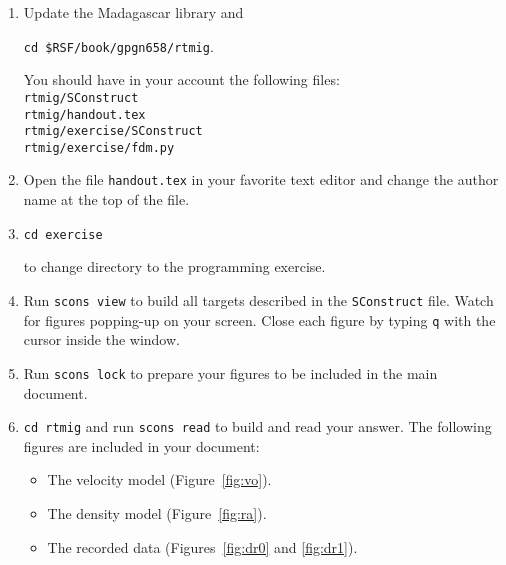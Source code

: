\begin{enumerate}

\item Update the Madagascar library and

\texttt{cd \$RSF/book/gpgn658/rtmig}.

You should have in your 
account the following files:\\
\texttt{rtmig/SConstruct} \\
\texttt{rtmig/handout.tex} \\
\texttt{rtmig/exercise/SConstruct} \\
\texttt{rtmig/exercise/fdm.py}

\item 
Open the file \texttt{handout.tex} in your favorite text editor
and change the author name at the top of the file.

\item 
\texttt{cd exercise} \par
to change directory to the programming exercise.

\item 
Run \texttt{scons view} to build all targets described in the
\texttt{SConstruct} file. Watch for figures popping-up on your screen.
Close each figure by typing \texttt{q} with the cursor inside the window.

\item
Run \texttt{scons lock} to prepare your figures to be included in the
main document.

\item 
\texttt{cd rtmig} and run \texttt{scons read} to build and 
read your answer. The following figures are included in your document:


\begin{itemize}

\item The velocity model (Figure~\ref{fig:vo}).

\item The density model (Figure~\ref{fig:ra}).

\item The recorded data (Figures~\ref{fig:dr0} and \ref{fig:dr1}).

\end{itemize}

\end{enumerate}

